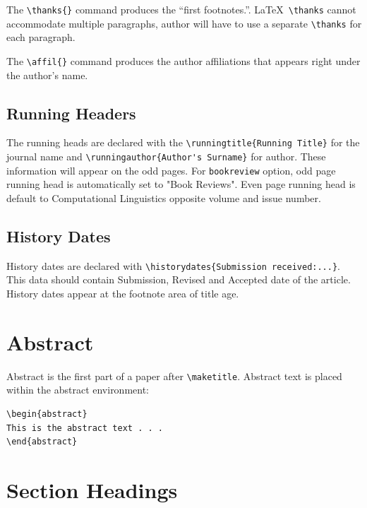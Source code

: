 The \verb|\thanks{}| command produces the ``first footnotes.''. \LaTeX\ \verb|\thanks| 
cannot accommodate multiple paragraphs, author will have to use a separate \verb|\thanks|
for each paragraph.

The \verb|\affil{}| command produces the author affiliations that appears right under the author's name.

\subsection{Running Headers} The running heads are declared with the \verb|\runningtitle{Running Title}| for the journal name and \verb|\runningauthor{Author's Surname}| for author. These information will appear on the odd pages. For {\tt bookreview} option, odd page running head is automatically set to "Book Reviews". Even page running head is default to Computational Linguistics opposite volume and issue number.

\subsection{History Dates}

History dates are declared with \verb|\historydates{Submission received:...}|. This data should contain Submission, Revised and Accepted date of the article. History dates appear at the footnote area of title age.

\section{Abstract}

Abstract is the first part of a paper after \verb|\maketitle|. Abstract text is placed within the abstract environment:

\begin{verbatim}
\begin{abstract}
This is the abstract text . . .
\end{abstract}
\end{verbatim}

\section{Section Headings}

